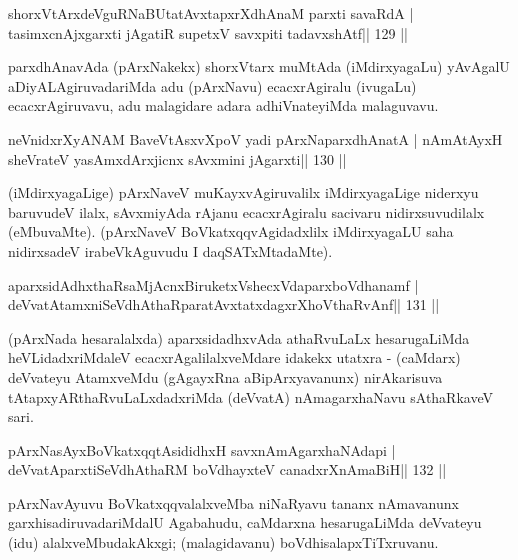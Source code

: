 \begin{shl}
shorxVtArxdeVguRNaBUtatAvxtapxrXdhAnaM parxti savaRdA |
tasimxcnAjxgarxti jAgatiR supetxV savxpiti tadavxshAtf\hfill || 129 ||
\end{shl}

\begin{artha}
parxdhAnavAda (pArxNakekx) shorxVtarx muMtAda (iMdirxyagaLu) yAvAgalU aDi\-yALAgiruvadariMda adu (pArxNavu) ecacxrAgiralu (ivugaLu) ecacxrAgiruvavu, adu malagidare adara adhiVnateyiMda malaguvavu.
\end{artha}

\begin{shl}
neVnidxrXyANAM BaveVtAsxvXpoV yadi pArxNaparxdhAnatA |
nAmAtAyxH sheVrateV yasAmxdArxjicnx sAvxmini jAgarxti\hfill || 130 ||
\end{shl}

\begin{artha}
(iMdirxyagaLige) pArxNaveV muKayxvAgiruvalilx iMdirxyagaLige niderxyu  baruvudeV ilalx, sAvxmiyAda rAjanu ecacxrAgiralu sacivaru nidirxsuvudilalx (eMbuvaMte). (pArxNaveV BoVkatxqqvAgidadxlilx iMdirxyagaLU saha nidirxsadeV irabeVkAguvudu I daqSATxMtadaMte).
\end{artha}


\begin{shl}
aparxsidAdhxthaRsaMjAcnxBiruketxVshecxVdaparxboVdhanamf |
deVvatAtamxniSeVdhAthaRparatAvxtatxdagxrXhoV\s thaRvAnf\hfill || 131 ||
\end{shl}

\begin{artha}
(pArxNada hesaralalxda) aparxsidadhxvAda athaRvuLaLx hesarugaLiMda  heVLidadxriMdaleV ecacxrAgalilalxveMdare idakekx utatxra - (caMdarx) deVvateyu AtamxveMdu (gAgayxRna aBipArxyavanunx) nirAkarisuva tAtapxyARthaRvuLaLxdadxriMda (deVvatA) nAma\-garxhaNavu sAthaRkaveV sari.
\end{artha}


\begin{shl}
pArxNasAyxBoVkatxqqtAsididhxH savxnAmAgarxhaNAdapi |
deVvatAparxtiSeVdhAthaRM boVdhayxteV  canadxrXnAmaBiH\hfill || 132 ||
\end{shl}

\begin{artha}
pArxNavAyuvu BoVkatxqqvalalxveMba niNaRyavu tananx nAmavanunx garxhisadiruvada\-riMdalU Agabahudu, caMdarxna hesarugaLiMda deVvateyu (idu) alalxveMbu\-dakAkxgi; (malagidavanu) boVdhisalapxTiTxruvanu.
\end{artha}

